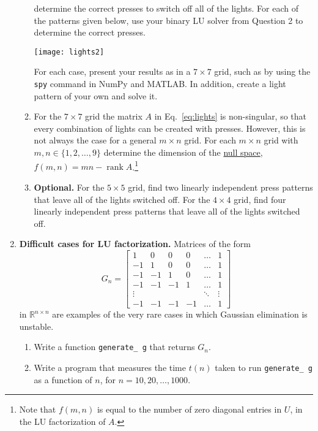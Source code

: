 \documentclass[11pt]{article}
\newcommand{\R}{\mathbb{R}}
\DeclareMathOperator{\rank}{rank}
\begin{document}
\begin{enumerate}
\begin{enumerate}
	determine the correct presses to switch off all of the lights. For each
	of the patterns given below, use your binary LU solver from Question 2
	to determine the correct presses.
	\begin{center}
	  \texttt{[image: lights2]}
	\end{center}
	For each case, present your results as in a $7\times 7$ grid, such as
	by using the \texttt{spy} command in NumPy and MATLAB. In addition,
	create a light pattern of your own and solve it.
      \item For the $7\times 7$ grid the matrix $A$ in Eq.~\ref{eq:lights} is
	non-singular, so that every combination of lights can be created with
	presses. However, this is not always the case for a general $m\times n$
	grid. For each $m\times n$ grid with $m,n\in \{1,2,\ldots,9\}$
	determine the dimension of the
	\href{http://en.wikipedia.org/wiki/Kernel_(linear_algebra)}{null
	space}, $f(m,n)=mn-\rank A$.\footnote{Note that $f(m,n)$ is equal to
	the number of zero diagonal entries in $U$, in the LU factorization of $A$.}
      \item {\bf Optional.} For the $5\times 5$ grid, find two linearly independent press patterns that leave all of the lights switched off. For the $4\times 4$ grid, find four linearly independent press patterns that leave all of the lights switched off.
    \end{enumerate}
  \item {\bf Difficult cases for LU factorization.} Matrices of the form 
      \begin{equation}
	G_n =
	\left[
	\begin{array}{cccccc}
	 1 &0 &0 &0&\ldots &1\\
	 -1 &1 &0 &0&\ldots &1\\
	 -1 &-1 &1 &0&\ldots &1\\
	 -1 &-1 &-1 &1&\ldots &1\\
	 \vdots & & & & \ddots & \vdots\\
	-1 & -1 & -1 &-1& \ldots & 1
	\end{array}
	\right]
      \end{equation}
    in $\R^{n\times n}$ are examples of the very rare cases in which Gaussian elimination is unstable.
    \begin{enumerate}
      \item Write a function \texttt{generate\_\,g} that returns $G_n$.
      \item Write a program that measures the time $t(n)$ taken to run
	\texttt{generate\_\,g} as a function of $n$, for $n=10,20,\ldots,1000$.

\end{enumerate}
\end{enumerate}
\end{document}
